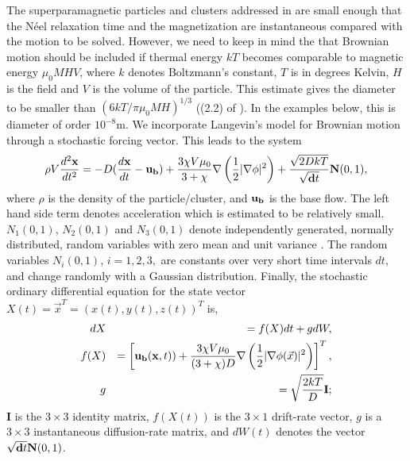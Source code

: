   The superparamagnetic particles and clusters addressed in \cite{YLAR2012} are small enough that the N\'eel relaxation time and the  magnetization are  instantaneous compared with the motion to be solved\cite{Bala2014}. However, we need  to keep in mind the that Brownian motion  should be included  if thermal energy $kT$ becomes  comparable to magnetic energy $\mu_0 MHV$, where $k$ denotes Boltzmann's constant, $T$ is in degrees Kelvin, $H$ is the field and $V$ is the volume of the particle.  This estimate gives the diameter to be smaller than  $(6kT/\pi\mu_0MH)^{1/3}$  ((2.2) of  \cite{Rosensweig}). In the examples  below, this is diameter of order $10^{-8}$m. 
 We incorporate Langevin's model for  Brownian motion 
through a stochastic forcing vector.  This leads to the system
\begin{equation}
\rho V\frac{d^2 {\bf x}}{dt^2} = -D (\frac{d{\bf  x}}{dt} - {\bf u_b}) + \frac{3 \chi V \mu_0  }
{ 3 + \chi} \nabla \left(\frac{1}{2}|\nabla\phi|^2\right) + \frac{\sqrt{2DkT}}{\sqrt{{\bf d}t}}{\bf N}(0,1), \label{brownian}
\end{equation}
where $\rho$ is the density of the particle/cluster, and ${\bf u_b}$ is
the base flow.  The left hand side term denotes acceleration which is estimated to be relatively small. $N_1(0,1)$, $N_2(0,1)$ and $N_3(0,1)$ denote independently generated, normally distributed,
random variables with zero mean and unit variance . The random variables $N_i(0,1)$, $i=1,2,3,$ are  constants over
very short time intervals $dt$, and change randomly with a Gaussian distribution. Finally, the stochastic ordinary differential equation for the state vector
$X (t)= {\vec x}^T =(x(t),y(t),z(t))^T$ is,
\begin{eqnarray}
dX && =f(X) dt + g dW, \\ 
f(X) && = \left[{\bf u_b}({\bf  x},t)) +  \frac{3 \chi V \mu_0  }{ (3 + \chi) D} \nabla \left( \frac{1}{2} |\nabla\phi(\vec x)|^2 
\right) \right]^T, \\
g && =  \sqrt{\frac{2kT}{D}} \mathbf{I};\label{system2}
\end{eqnarray}
 $\mathbf{I}$ is the $3\times 3$ identity matrix,
$f(X(t))$ is the $3\times 1$ drift-rate vector, $g$ is a  $3\times 3$ instantaneous diffusion-rate
matrix, and $dW(t)$ denotes the vector  $\sqrt{{\bf d}t} {\bf  N}(0,1)$.  

